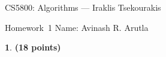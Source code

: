\documentclass[11pt]{article}
\newcommand{\yourname}{Avinash R. Arutla}
\theoremstyle{definition}
\newcommand{\instructor}{Iraklis Tsekourakis}
\newcommand{\hwnum}{1}
\newtheorem{prob}{}
\newcommand{\solution}{\medskip\noindent{\color{DarkBlue}\textbf{Solution:}}}
\begin{document}
{\Large
\begin{center}{CS5800: Algorithms} --- \instructor \end{center}}
{\large
\vspace{10pt}
\noindent Homework~\hwnum \vspace{2pt}%
}
\bigskip
{\large \noindent Name: \yourname }
\vspace{15pt}





 
\begin{prob} \textbf{(18 points)}
\end{prob}
\end{document}
